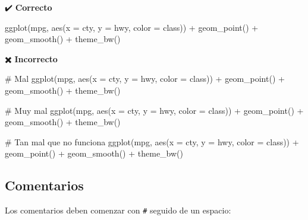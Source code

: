 \documentclass[
  spanish,
  a4paper,
]{scrbook}
\newenvironment{Shaded}{\begin{snugshade}}{\end{snugshade}}
\newcommand{\AttributeTok}[1]{\textcolor[rgb]{0.40,0.45,0.13}{#1}}
\newcommand{\CommentTok}[1]{\textcolor[rgb]{0.37,0.37,0.37}{#1}}
\newcommand{\FunctionTok}[1]{\textcolor[rgb]{0.28,0.35,0.67}{#1}}
\newcommand{\NormalTok}[1]{\textcolor[rgb]{0.00,0.23,0.31}{#1}}
\newcommand{\SpecialCharTok}[1]{\textcolor[rgb]{0.37,0.37,0.37}{#1}}
\begin{document}
✔️ \textbf{Correcto}

\begin{Shaded}
\begin{Highlighting}[]
\FunctionTok{ggplot}\NormalTok{(mpg, }\FunctionTok{aes}\NormalTok{(}\AttributeTok{x =}\NormalTok{ cty, }\AttributeTok{y =}\NormalTok{ hwy, }\AttributeTok{color =}\NormalTok{ class)) }\SpecialCharTok{+}
  \FunctionTok{geom\_point}\NormalTok{() }\SpecialCharTok{+}
  \FunctionTok{geom\_smooth}\NormalTok{() }\SpecialCharTok{+}
  \FunctionTok{theme\_bw}\NormalTok{()}
\end{Highlighting}
\end{Shaded}

✖️ \textbf{Incorrecto}

\begin{Shaded}
\begin{Highlighting}[]
\CommentTok{\# Mal}
\FunctionTok{ggplot}\NormalTok{(mpg, }\FunctionTok{aes}\NormalTok{(}\AttributeTok{x =}\NormalTok{ cty, }\AttributeTok{y =}\NormalTok{ hwy, }\AttributeTok{color =}\NormalTok{ class)) }\SpecialCharTok{+}
  \FunctionTok{geom\_point}\NormalTok{() }\SpecialCharTok{+} \FunctionTok{geom\_smooth}\NormalTok{() }\SpecialCharTok{+}
  \FunctionTok{theme\_bw}\NormalTok{()}

\CommentTok{\# Muy mal}
\FunctionTok{ggplot}\NormalTok{(mpg, }\FunctionTok{aes}\NormalTok{(}\AttributeTok{x =}\NormalTok{ cty, }\AttributeTok{y =}\NormalTok{ hwy, }\AttributeTok{color =}\NormalTok{ class)) }\SpecialCharTok{+} \FunctionTok{geom\_point}\NormalTok{() }\SpecialCharTok{+} \FunctionTok{geom\_smooth}\NormalTok{() }\SpecialCharTok{+} \FunctionTok{theme\_bw}\NormalTok{()}

\CommentTok{\# Tan mal que no funciona}
\FunctionTok{ggplot}\NormalTok{(mpg, }\FunctionTok{aes}\NormalTok{(}\AttributeTok{x =}\NormalTok{ cty, }\AttributeTok{y =}\NormalTok{ hwy, }\AttributeTok{color =}\NormalTok{ class))}
  \SpecialCharTok{+} \FunctionTok{geom\_point}\NormalTok{()}
  \SpecialCharTok{+} \FunctionTok{geom\_smooth}\NormalTok{() }
  \SpecialCharTok{+} \FunctionTok{theme\_bw}\NormalTok{()}
\end{Highlighting}
\end{Shaded}

\subsection{Comentarios}\label{comentarios}

Los comentarios deben comenzar con \texttt{\#} seguido de un espacio:
\end{document}
